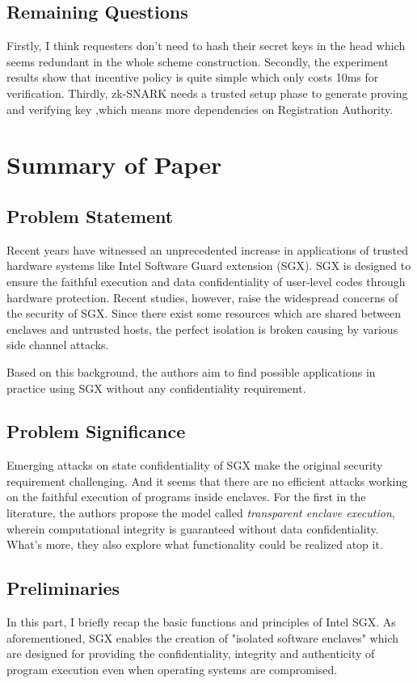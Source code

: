 \documentclass[conference]{IEEEtran}
\begin{document}
\subsection{Remaining Questions}
Firstly, I think requesters don't need to hash their secret keys in the head which seems redundant in the whole scheme construction.
%
Secondly, the experiment results show that incentive policy is quite simple which only costs 10ms for verification.
%
Thirdly, zk-SNARK needs a trusted setup phase to generate proving and verifying key ,which means more dependencies on Registration Authority.


\section{Summary of Paper\cite{tramer2017sealed}}

\subsection{Problem Statement}
Recent years have witnessed an unprecedented increase in applications of trusted hardware systems like Intel Software Guard extension (SGX).
%
SGX is designed to ensure the faithful execution and data confidentiality of user-level codes through hardware protection.
%
Recent studies, however, raise the widespread concerns of the security of SGX.
%
Since there exist some resources which are shared between enclaves and untrusted hosts, the perfect isolation is broken causing by various side channel attacks.

Based on this background, the authors aim to find possible applications in practice using SGX without any confidentiality requirement.

\subsection{Problem Significance}
Emerging attacks on state confidentiality of SGX make the original security requirement challenging.
%
And it seems that there are no efficient attacks working on the faithful execution of programs inside enclaves.
%
For the first in the literature, the authors propose the model called \textsl{transparent enclave execution}, wherein computational integrity is guaranteed without data confidentiality.
%
What's more, they also explore what functionality could be realized atop it.


\subsection{Preliminaries}
In this part, I briefly recap the basic functions and principles of Intel SGX.
%
As aforementioned, SGX enables the creation of "isolated software enclaves" which are designed for providing the confidentiality, integrity and authenticity of program execution even when operating systems are compromised.
\end{document}
